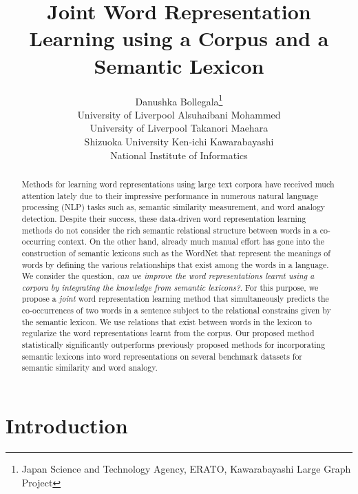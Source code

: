 \documentclass[letterpaper]{article}
\begin{document}
\title{Joint Word  Representation Learning using a Corpus and a Semantic Lexicon}


\author{Danushka Bollegala\thanks{Japan Science and Technology Agency, ERATO, Kawarabayashi Large Graph Project} \\ University of Liverpool \And
 Alsuhaibani Mohammed \\ University of Liverpool \And
Takanori Maehara\footnotemark[1] \\
Shizuoka University  \And
Ken-ichi Kawarabayashi\footnotemark[1] \\
National Institute of Informatics}


\maketitle
\begin{abstract}
Methods for learning word representations using large text corpora have received much attention lately due to their impressive performance
in numerous natural language processing (NLP) tasks such as, semantic similarity measurement, and word analogy detection.
Despite their success, these data-driven word representation learning methods do not consider
the rich semantic relational structure between words in a co-occurring context.
On the other hand, already much manual effort has gone into the construction of semantic lexicons such as the WordNet
that represent the meanings of words by defining the various relationships that exist among the words in a language.
We consider the question, \emph{can we improve the word representations learnt using a corpora by integrating the
knowledge from semantic lexicons?}. For this purpose, we propose a \emph{joint} word representation learning method that simultaneously predicts
the co-occurrences of two words in a sentence subject to the relational constrains given by the semantic lexicon.
We use relations that exist between words in the lexicon to regularize the word representations learnt from the corpus.
Our proposed method statistically significantly outperforms previously proposed methods for incorporating semantic lexicons into word
representations on several benchmark datasets for semantic similarity and word analogy.
\end{abstract}

\section{Introduction}
\label{sec:intro}
\end{document}
